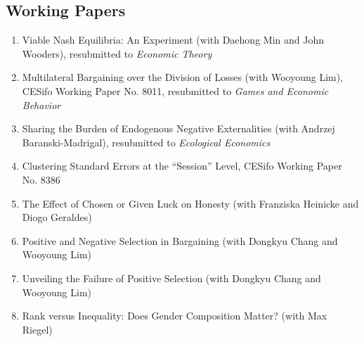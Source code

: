 \documentclass[margin, a4paper]{res}
\begin{document}
\begin{resume}
\section{Working Papers}
\begin{enumerate}[leftmargin=*]
\item Viable Nash Equilibria: An Experiment (with Daehong Min and John Wooders), resubmitted to \emph{Economic Theory}
\item Multilateral Bargaining over the Division of Losses (with Wooyoung Lim), CESifo Working Paper No. 8011, resubmitted to \emph{Games and Economic Behavior}
\item Sharing the Burden of Endogenous Negative Externalities (with Andrzej Baranski-Madrigal), resubmitted to \emph{Ecological Economics}
\item Clustering Standard Errors at the ``Session'' Level, CESifo Working Paper No. 8386
\item The Effect of Chosen or Given Luck on Honesty (with Franziska Heinicke and Diogo Geraldes)
\item Positive and Negative Selection in Bargaining (with Dongkyu Chang and Wooyoung Lim)
\item Unveiling the Failure of Positive Selection (with Dongkyu Chang and Wooyoung Lim)
\item Rank versus Inequality: Does Gender Composition Matter? (with Max Riegel)

\end{enumerate}



\end{resume}
\end{document}
